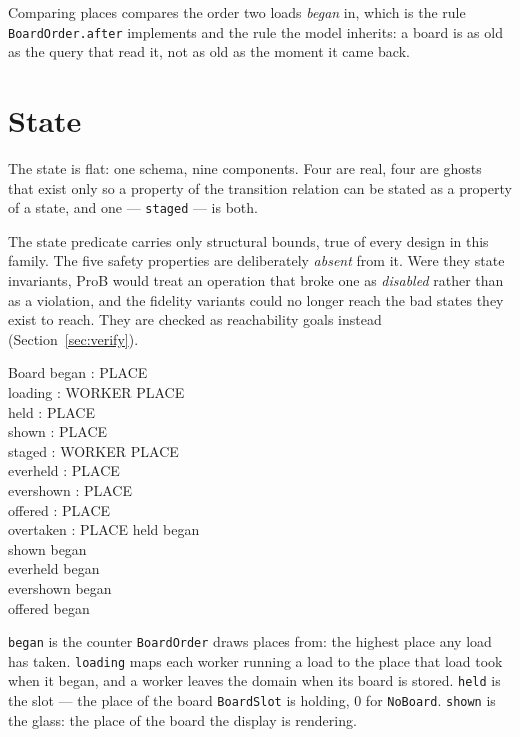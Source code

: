 \documentclass[a4paper,10pt,fleqn]{article}
\begin{document}
Comparing places compares the order two loads \emph{began} in, which is the rule
\texttt{BoardOrder.after} implements and the rule the model inherits: a board is
as old as the query that read it, not as old as the moment it came back.

\section{State}

The state is flat: one schema, nine components. Four are real, four are ghosts
that exist only so a property of the transition relation can be stated as a
property of a state, and one --- \texttt{staged} --- is both.

The state predicate carries only structural bounds, true of every design in this
family. The five safety properties are deliberately \emph{absent} from it. Were
they state invariants, ProB would treat an operation that broke one as
\emph{disabled} rather than as a violation, and the fidelity variants could no
longer reach the bad states they exist to reach. They are checked as
reachability goals instead (Section~\ref{sec:verify}).

\begin{schema}{Board}
  began : PLACE \\
  loading : WORKER \pfun PLACE \\
  held : PLACE \\
  shown : PLACE \\
  staged : WORKER \pfun PLACE \\
  everheld : PLACE \\
  evershown : PLACE \\
  offered : PLACE \\
  overtaken : \power PLACE
\where
  held \leq began \\
  shown \leq began \\
  everheld \leq began \\
  evershown \leq began \\
  offered \leq began
\end{schema}

\texttt{began} is the counter \texttt{BoardOrder} draws places from: the highest
place any load has taken. \texttt{loading} maps each worker running a load to
the place that load took when it began, and a worker leaves the domain when its
board is stored. \texttt{held} is the slot --- the place of the board
\texttt{BoardSlot} is holding, $0$ for \texttt{NoBoard}. \texttt{shown} is the
glass: the place of the board the display is rendering.
\end{document}

